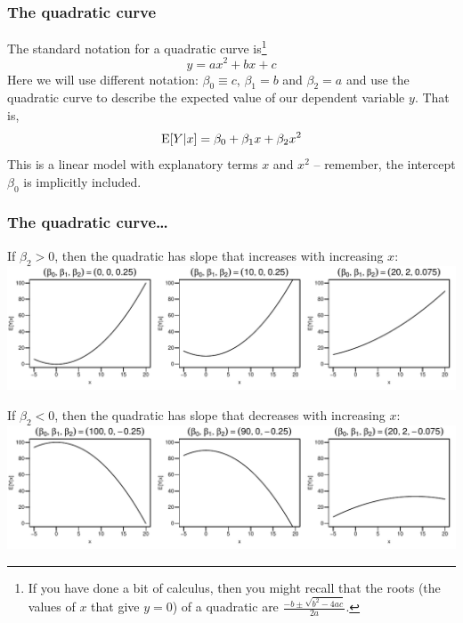 \documentclass{beamer}\usepackage[]{graphicx}\usepackage[]{xcolor}
\makeatletter
\def\maxwidth{ %
  \ifdim\Gin@nat@width>\linewidth
    \linewidth
  \else
    \Gin@nat@width
  \fi
}
\newenvironment{knitrout}{}{} %
\makeatother
\begin{document}

\begin{frame}[fragile]
\frametitle{The quadratic curve} 
The standard notation for a quadratic curve is\footnote{If you have done a bit of 
calculus, then you might recall that the roots (the values of $x$ that give $y=0$) of a 
quadratic are $\frac{-b \pm \sqrt{b^2-4ac}}{2a}$. }
\[ 
y = a x^2 + b x + c 
\]
Here we will use different notation: 
$\beta_0 \equiv c$, $\beta_1=b$ and $\beta_2=a$ and use the quadratic curve to
describe the expected value of our dependent variable $y$.
That is,
\[ 
\operatorname{E}[Y|x] = \beta_0 + \beta_1 x + \beta_2 x^2 
\]
This is a linear model with explanatory terms $x$ and $x^2$ -- remember, the intercept $\beta_0$ is implicitly included.
\end{frame}


\begin{frame}[ fragile]
\frametitle{The quadratic curve\ldots}
If $\beta_2>0$, then the quadratic has slope that increases with increasing $x$:
\begin{knitrout}\scriptsize
{}\color{fgcolor}
\includegraphics[width=\maxwidth]{figure/RC-H04-009-1} 
\end{knitrout}

If $\beta_2<0$, then the quadratic has slope that decreases with increasing $x$:
\begin{knitrout}\scriptsize
{}\color{fgcolor}
\includegraphics[width=\maxwidth]{figure/RC-H04-010-1} 
\end{knitrout}
\end{frame}
\end{document}
